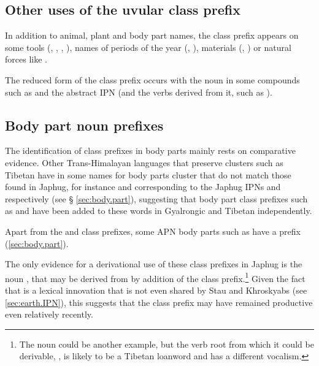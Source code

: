 \subsection{Other uses of the uvular class prefix} \label{sec:uvular.other}
In addition to animal, plant and body part names, the class prefix  appears on some tools (, , , 
), names of periods of the year (, ), materials (, ) or natural forces like .

The reduced form  of the class prefix occurs with the noun  in some compounds such as  and the abstract IPN  (and the verbs derived from it, such as ).
  
\subsection{Body part noun prefixes}  \label{ex:body.part.prefix}
The identification of class prefixes in body parts mainly rests on comparative evidence. Other Trans-Himalayan languages that preserve clusters such as Tibetan have in some names for body parts cluster that do not match those found in Japhug, for instance  and  corresponding to the Japhug IPNs  and  respectively (see § \ref{sec:body.part}), suggesting that body part class prefixes such as  and  have been added to these words in Gyalrongic and Tibetan independently.

Apart from the  and  class prefixes, some APN body parts such as  have a   prefix (\ref{sec:body.part}).

The only evidence for a derivational use of these class prefixes in Japhug is the noun , that may be derived from  by addition of the  class prefix.\footnote{The noun  could be another example, but the verb root from which it could be derivable, , is likely to be a Tibetan loanword and has a different vocalism. } Given the fact that  is a lexical innovation that is not even shared by Stau and Khroskyabs (see \ref{sec:earth.IPN}), this suggests that the class prefix  may have remained productive even relatively recently.

